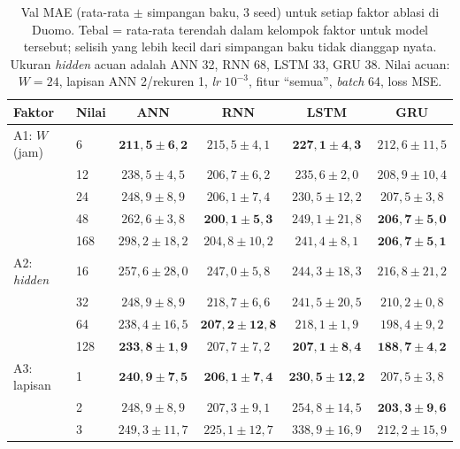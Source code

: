 \documentclass[conference,a4paper]{IEEEtran}
\begin{document}
\begin{table}[t]
  \centering
  \caption{Val MAE (rata-rata $\pm$ simpangan baku, 3 seed) untuk setiap faktor ablasi di Duomo. Tebal = rata-rata terendah dalam kelompok faktor untuk model tersebut; selisih yang lebih kecil dari simpangan baku tidak dianggap nyata. Ukuran \textit{hidden} acuan adalah ANN 32, RNN 68, LSTM 33, GRU 38. Nilai acuan: $W=24$, lapisan ANN 2/rekuren 1, \textit{lr} $10^{-3}$, fitur ``semua'', \textit{batch} 64, loss MSE.}
  \label{tab:ablasi}
  \footnotesize
  \begin{tabular}{@{}llcccc@{}}
    \toprule
    Faktor & Nilai & ANN & RNN & LSTM & GRU \\
    \midrule
    A1: $W$ (jam) & 6   & $\mathbf{211{,}5 \pm 6{,}2}$ & $215{,}5 \pm 4{,}1$ & $\mathbf{227{,}1 \pm 4{,}3}$ & $212{,}6 \pm 11{,}5$ \\
                  & 12  & $238{,}5 \pm 4{,}5$ & $206{,}7 \pm 6{,}2$ & $235{,}6 \pm 2{,}0$ & $208{,}9 \pm 10{,}4$ \\
                  & 24  & $248{,}9 \pm 8{,}9$ & $206{,}1 \pm 7{,}4$ & $230{,}5 \pm 12{,}2$ & $207{,}5 \pm 3{,}8$ \\
                  & 48  & $262{,}6 \pm 3{,}8$ & $\mathbf{200{,}1 \pm 5{,}3}$ & $249{,}1 \pm 21{,}8$ & $\mathbf{206{,}7 \pm 5{,}0}$ \\
                  & 168 & $298{,}2 \pm 18{,}2$ & $204{,}8 \pm 10{,}2$ & $241{,}4 \pm 8{,}1$ & $\mathbf{206{,}7 \pm 5{,}1}$ \\
    \midrule
    A2: \textit{hidden} & 16  & $257{,}6 \pm 28{,}0$ & $247{,}0 \pm 5{,}8$ & $244{,}3 \pm 18{,}3$ & $216{,}8 \pm 21{,}2$ \\
                        & 32  & $248{,}9 \pm 8{,}9$ & $218{,}7 \pm 6{,}6$ & $241{,}5 \pm 20{,}5$ & $210{,}2 \pm 0{,}8$ \\
                        & 64  & $238{,}4 \pm 16{,}5$ & $\mathbf{207{,}2 \pm 12{,}8}$ & $218{,}1 \pm 1{,}9$ & $198{,}4 \pm 9{,}2$ \\
                        & 128 & $\mathbf{233{,}8 \pm 1{,}9}$ & $207{,}7 \pm 7{,}2$ & $\mathbf{207{,}1 \pm 8{,}4}$ & $\mathbf{188{,}7 \pm 4{,}2}$ \\
    \midrule
    A3: lapisan & 1 & $\mathbf{240{,}9 \pm 7{,}5}$ & $\mathbf{206{,}1 \pm 7{,}4}$ & $\mathbf{230{,}5 \pm 12{,}2}$ & $207{,}5 \pm 3{,}8$ \\
                & 2 & $248{,}9 \pm 8{,}9$ & $207{,}3 \pm 9{,}1$ & $254{,}8 \pm 14{,}5$ & $\mathbf{203{,}3 \pm 9{,}6}$ \\
                & 3 & $249{,}3 \pm 11{,}7$ & $225{,}1 \pm 12{,}7$ & $338{,}9 \pm 16{,}9$ & $212{,}2 \pm 15{,}9$ \\

\end{tabular}
\end{table}
\end{document}
